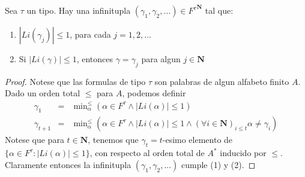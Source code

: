 \begin{lemma}
  Sea $\tau$ un tipo. Hay una infinitupla $(\gamma_1,\gamma_2,\dots)\in {F^\tau}^\mathbf{N}$ tal que:\begin{enumerate}
    \item $|Li(\gamma_j)|\leq 1$, para cada $j=1,2,\dots$
    \item Si $|Li(\gamma)|\leq 1$, entonces $\gamma=\gamma_j$ para algun $j\in\mathbf{N}$
  \end{enumerate}
\end{lemma}
\begin{proof}
  Notese que las formulas de tipo $\tau $ son palabras de algun alfabeto
finito $A$. Dado un orden total $\leq $ para $A$, podemos definir%
\begin{eqnarray*}
\gamma _{1} &=&\min\nolimits_{\alpha }^{\leq }\left( \alpha \in F^{\tau
}\wedge \left\vert Li(\alpha )\right\vert \leq 1\right)  \\
\gamma _{t+1} &=&\min\nolimits_{\alpha }^{\leq }\left( \alpha \in F^{\tau
}\wedge \left\vert Li(\alpha )\right\vert \leq 1\wedge (\forall i\in \mathbf{N}
)_{i\leq t}\alpha \neq \gamma _{i}\right) 
\end{eqnarray*}%
Notese que para $t\in \mathbf{N}$, tenemos que $\gamma _{t}=t$-esimo
elemento de $\{\alpha \in F^{\tau }:\left\vert Li(\alpha )\right\vert \leq
1\}$, con respecto al orden total de $A^{\ast }$ inducido por $\leq $.
Claramente entonces la infinitupla $(\gamma _{1},\gamma _{2},...)$ cumple
(1) y (2).
\end{proof}

